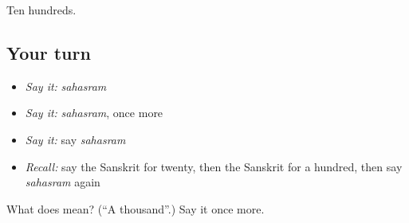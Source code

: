 \begin{grammarlens}[title={What you've built}]
Ten hundreds.
\end{grammarlens}

\subsection*{Your turn}
\begin{itemize}
\raggedright
  \item \emph{Say it:} \emph{sahasram}
  \item \emph{Say it:} \emph{sahasram}, once more
  \item \emph{Say it:} say \emph{sahasram}
  \item \emph{Recall:} say the Sanskrit for twenty, then the Sanskrit for a hundred, then say \emph{sahasram} again
\end{itemize}

\begin{tcolorbox}[breakable,colback=teal!4,colframe=teal!35!black,title={Before you move on}]
What does  mean? (\textquotedblleft{}A thousand\textquotedblright{}.) Say it once more.
\end{tcolorbox}
